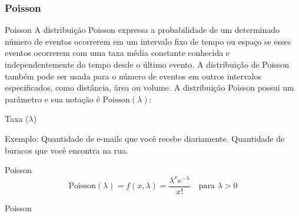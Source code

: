 \subsubsection{Poisson}
\begin{frame}{Poisson}
    A distribuição Poisson expressa a probabilidade de um determinado número de
    eventos ocorrerem em um intervalo fixo de tempo ou espaço se esses eventos
    ocorrerem com uma taxa média constante conhecida e independentemente do tempo
    desde o último evento. A distribuição de Poisson também pode ser usada
    para o número de eventos em outros intervalos especificados, como distância,
    área ou volume.
    \vfill
    A distribuição Poisson possui um parâmetro e sua notação é $\text{Poisson}(\lambda)$:
    \begin{vfilleditems}
        \item Taxa ($\lambda$)
    \end{vfilleditems}
    \vfill
    Exemplo: Quantidade de e-mails que você recebe diariamente. Quantidade de buracos que você encontra na rua.
\end{frame}

\begin{frame}{Poisson}
    $$\text{Poisson}(\lambda) = f(x, \lambda) = \frac{\lambda^x e^{-\lambda}}{x!} \quad \text{para $\lambda > 0$}$$
\end{frame}

\begin{frame}{Poisson}
  \centering
\end{frame}

